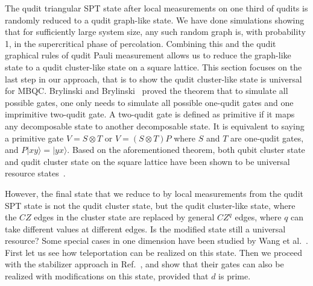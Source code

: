 \documentclass[aps,amsfonts,pra,twocolumn,showpacs]{revtex4-1}
\begin{document}
	The qudit triangular SPT state after local measurements on one third of qudits is randomly reduced to a qudit graph-like state. We have done simulations showing that for sufficiently large system size, any such random graph is, with probability 1, in the supercritical phase of percolation. Combining this and the qudit graphical rules of qudit Pauli measurement allows us to reduce the graph-like state to a qudit cluster-like state on a square lattice. This section focuses on the last step in our approach, that is to show the qudit cluster-like state is universal for MBQC. Brylinski and Brylinski~\cite{Brylinski2001} proved the theorem that to simulate all possible gates, one only needs to simulate all possible one-qudit gates and one imprimitive two-qudit gate. A two-qudit gate is defined as primitive if it maps any decomposable state to another decomposable state. It is equivalent to saying a primitive gate $V=S\otimes T$ or $V=(S\otimes T)P$ where $S$ and $T$ are one-qudit gates, and $P|xy\rangle=|yx\rangle$. Based on the aforementioned theorem, both qubit cluster state and qudit cluster state on the square lattice have been shown to be universal resource states~\cite{Raussendorf2003, Hall2006, Zhou2003}.

	However, the final state that we reduce to by local measurements from the qudit SPT state is not the qudit cluster state, but the qudit cluster-like state, where the $CZ$ edges in the cluster state are replaced by general $CZ^q$ edges, where $q$ can take different values at different edges. Is the modified state still a universal resource? Some special cases in one dimension have been studied by Wang et al.~\cite{Wang2017}. First let us see how teleportation can be realized on this state. Then we proceed with the stabilizer approach in Ref.~\cite{Raussendorf2003, Zhou2003}, and show that their gates can also be realized with modifications on this state, provided that $d$ is prime.
\end{document}
